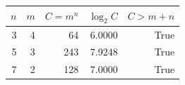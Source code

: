 \begin{tabular}{rrrrr}
\toprule
$n$ & $m$ & $C = m^n$ & $\log_2 C$ & $C > m+n$ \\
\midrule
3 & 4 & 64 & 6.0000 & True \\
5 & 3 & 243 & 7.9248 & True \\
7 & 2 & 128 & 7.0000 & True \\
\bottomrule
\end{tabular}
